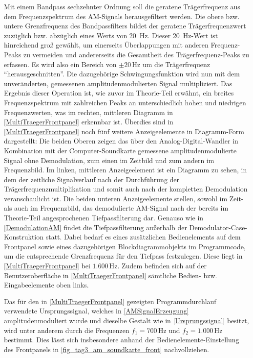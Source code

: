 \documentclass[
a4paper,
12pt,
pagesize,
ngerman
]{scrartcl}
\begin{document}
	\noindent Mit einem Bandpass sechzehnter Ordnung soll die geratene Trägerfrequenz aus dem Frequenzspektrum des AM-Signals herausgefiltert werden. 
	Die obere bzw. untere Grenzfrequenz des Bandpassfilters bildet der geratene Trägerfrequenzwert zuzüglich bzw. abzüglich eines Werts von \SI{20}{\hertz}. 
	Dieser \SI{20}{\hertz}-Wert ist hinreichend groß gewählt, um einerseits Überlappungen mit anderen Frequenz-Peaks zu vermeiden und andererseits die Gesamtheit des Trägerfrequenz-Peaks zu erfassen. 
	Es wird also ein Bereich von $\pm 20\,$Hz um die Trägerfrequenz \enquote{herausgeschnitten}. 
	Die dazugehörige Schwingungsfunktion wird nun mit dem unveränderten, gemessenen amplitudenmodulierten Signal multipliziert. 
	Das Ergebnis dieser Operation ist, wie zuvor im Theorie-Teil erwähnt, ein breites Frequenzspektrum mit zahlreichen Peaks an unterschiedlich hohen und niedrigen Frequenzwerten, was im rechten, mittleren Diagramm in \cref{MultiTraegerFrontpanel} erkennbar ist. 
	Überdies sind in \cref{MultiTraegerFrontpanel} noch fünf weitere Anzeigeelemente in Diagramm-Form dargestellt: Die beiden Oberen zeigen das über den Analog-Digital-Wandler in Kombination mit der Computer-Soundkarte gemessene amplitudenmodulierte Signal ohne Demodulation, zum einen im Zeitbild und zum andern im Frequenzbild. %
	Im linken, mittleren Anzeigeelement ist ein Diagramm zu sehen, in dem der zeitliche Signalverlauf nach der Durchführung der Trägerfrequenzmultiplikation und somit auch nach der kompletten Demodulation veranschaulicht ist. 
	Die beiden unteren Anzeigeelemente stellen, sowohl im Zeit- als auch im Frequenzbild, das demodulierte AM-Signal nach der bereits im Theorie-Teil angesprochenen Tiefpassfilterung dar. 
	Genauso wie in \cref{DemodulationAM} findet die Tiefpassfilterung außerhalb der Demodulator-Case-Konstruktion statt. 
	Dabei bedarf es eines zusätzlichen Bedienelements auf dem Frontpanel sowie eines dazugehörigen Blockdiagrammobjekts im Programmcode, um die entsprechende Grenzfrequenz für den Tiefpass festzulegen. 
	Diese liegt in \cref{MultiTraegerFrontpanel} bei $1.600\,$Hz. 
	Zudem befinden sich auf der Benutzeroberfläche in \cref{MultiTraegerFrontpanel} sämtliche Bedien- bzw. Eingabeelemente oben links.
	
	Das für den in \cref{MultiTraegerFrontpanel} gezeigten Programmdurchlauf verwendete Ursprungssignal, welches in \cref{AMSignalErzeugung} amplitudenmoduliert wurde und dieselbe Gestalt wie in \cref{Ursprungssignal} besitzt, wird unter anderem durch die Frequenzen $f_1 = 700\,$Hz und $f_2 = 1.000\,$Hz bestimmt. 
	Dies lässt sich insbesondere anhand der Bedienelemente-Einstellung des Frontpanels in \cref{fig_tag3_am_soundkarte_front} nachvollziehen. 
				
\end{document}
